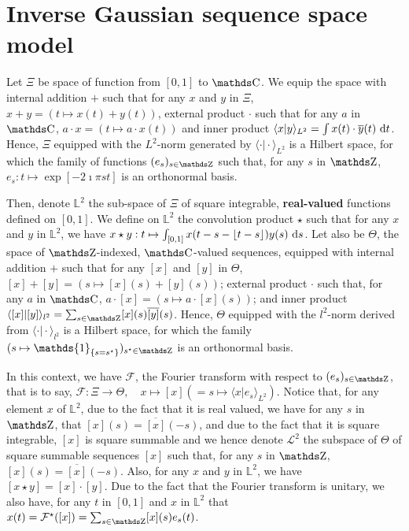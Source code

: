 \section{Inverse Gaussian sequence space model}\label{INTRO_IGSSM}

Let $\Xi$ be space of function from $[0, 1]$ to $\C$.
We equip the space with internal addition $+$ such that for any $x$ and $y$ in $\Xi$, $x + y = (t \mapsto x(t) + y(t))$, external product $\cdot$ such that for any $a$ in $\C$, $a \cdot x = (t \mapsto a \cdot x(t))$ and inner product $\langle x \vert y \rangle_{L^{2}} = \int x(t) \cdot \overline{y}(t) \operatorname{\, d \!} t$.
Hence, $\Xi$ equipped with the $L^{2}$-norm generated by $\langle \cdot \vert \cdot \rangle_{L^{2}}$ is a Hilbert space, for which the family of functions $(e_{s})_{s \in \Z}$ such that, for any $s$ in $\Z$, $e_{s} : t \mapsto \exp[- 2 \imath \pi s t]$ is an orthonormal basis.

Then, denote $\mathds{L}^{2}$ the sub-space of $\Xi$ of square integrable, \textbf{real-valued} functions defined on $[0, 1]$.
We define on $\mathds{L}^{2}$ the convolution product $\star$ such that for any $x$ and $y$ in $\mathds{L}^{2}$, we have $x \star y : t \mapsto \int_{[0, 1]} x(t - s - \lfloor t - s \rfloor) y(s) \operatorname{\, d \!} s$.
Let also be $\Theta$, the space of $\Z$-indexed, $\C$-valued sequences, equipped with internal addition $+$ such that for any $[x]$ and $[y]$ in $\Theta$, $[x] + [y] = (s \mapsto [x](s) + [y](s))$; external product $\cdot$ such that, for any $a$ in $\C$, $a \cdot [x] = (s \mapsto a \cdot [x](s))$; and inner product $\langle [x] \vert [y] \rangle_{l^{2}} = \sum_{s \in \Z} [x](s) \overline{[y]}(s)$.
Hence, $\Theta$ equipped with the $l^{2}$-norm derived from $\langle \cdot \vert \cdot \rangle_{l^{2}}$ is a Hilbert space, for which the family $(s \mapsto \mathds{1}_{\{s = s^{\star}\}})_{s^{\star} \in \Z}$ is an orthonormal basis.

In this context, we have $\mathcal{F}$, the Fourier transform with respect to $(e_{s})_{s \in \Z}$, that is to say, $\mathcal{F}: \Xi \to \Theta, \quad x \mapsto [x] (= s \mapsto \langle x \vert e_{s} \rangle_{L^{2}})$.
Notice that, for any element $x$ of $\mathds{L}^{2}$, due to the fact that it is real valued, we have for any $s$ in $\Z$, that $[x](s) = \overline{[x]}(-s)$, and due to the fact that it is square integrable, $[x]$ is square summable and we hence denote $\mathcal{L}^{2}$ the subspace of $\Theta$ of square summable sequences $[x]$ such that, for any $s$ in $\Z$, $[x](s) = \overline{[x]}(-s)$.
Also, for any $x$ and $y$ in $\mathds{L}^{2}$, we have $[x \star y] = [x] \cdot [y]$.
Due to the fact that the Fourier transform is unitary, we also have, for any $t$ in $[0, 1]$ and $x$ in $\mathds{L}^{2}$ that $x(t) = \mathcal{F}^{\star}([x]) = \sum_{s \in \Z} [x](s) e_{s}(t)$.

